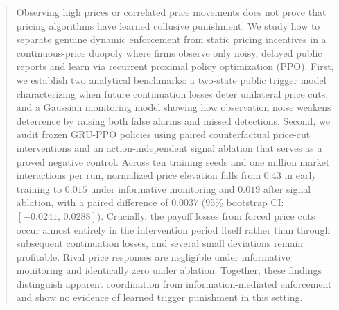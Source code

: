 

\maketitle

\begin{abstract}
Observing high prices or correlated price movements does not prove that pricing algorithms have learned collusive punishment. We study how to separate genuine dynamic enforcement from static pricing incentives in a continuous-price duopoly where firms observe only noisy, delayed public reports and learn via recurrent proximal policy optimization (PPO). First, we establish two analytical benchmarks: a two-state public trigger model characterizing when future continuation losses deter unilateral price cuts, and a Gaussian monitoring model showing how observation noise weakens deterrence by raising both false alarms and missed detections. Second, we audit frozen GRU-PPO policies using paired counterfactual price-cut interventions and an action-independent signal ablation that serves as a proved negative control. Across ten training seeds and one million market interactions per run, normalized price elevation falls from $0.43$ in early training to $0.015$ under informative monitoring and $0.019$ after signal ablation, with a paired difference of $0.0037$ (95\% bootstrap CI: $[-0.0241,\,0.0288]$). Crucially, the payoff losses from forced price cuts occur almost entirely in the intervention period itself rather than through subsequent continuation losses, and several small deviations remain profitable. Rival price responses are negligible under informative monitoring and identically zero under ablation. Together, these findings distinguish apparent coordination from information-mediated enforcement and show no evidence of learned trigger punishment in this setting.
\end{abstract}

